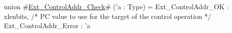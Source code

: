 union #\hyperref[sailRISCVzExtzyControlAddrzyCheck]{Ext\_ControlAddr\_Check}# ('a : Type) = {
  Ext_ControlAddr_OK : xlenbits, /* PC value to use for the target of the control operation */
  Ext_ControlAddr_Error : 'a
}
